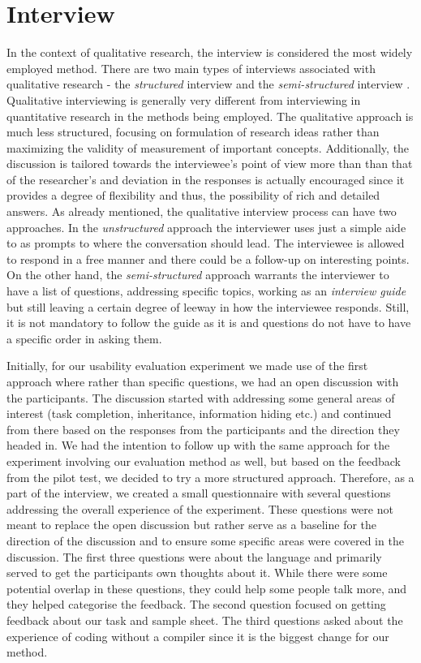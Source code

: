 \section{Interview}

In the context of qualitative research, the interview is considered the most widely employed method. There are two main types of interviews associated with qualitative research - the \textit{structured} interview and the \textit{semi-structured} interview . Qualitative interviewing is generally very different from  interviewing in quantitative research in the methods being employed. The qualitative approach is much less structured, focusing on formulation of research ideas rather than maximizing the validity of measurement of important concepts. Additionally, the discussion is tailored towards the interviewee's point of view more than than that of the researcher's and deviation in the responses is actually encouraged since it provides a degree of flexibility and thus, the possibility of rich and detailed answers. As already mentioned, the qualitative interview process can have two approaches. In the \textit{unstructured} approach the interviewer uses just a simple aide to as prompts to where the conversation should lead. The interviewee is allowed to respond in a free manner and there could be a follow-up on interesting points. On the other hand, the \textit{semi-structured} approach warrants the interviewer to have a list of questions, addressing specific topics, working as an \textit{interview guide} but still leaving a certain degree of leeway in how the interviewee responds. Still, it is not mandatory to follow the guide as it is and questions do not have to have a specific order in asking them. 

Initially, for our usability evaluation experiment we made use of the first approach where rather than specific questions, we had an open discussion with the participants. The discussion started with addressing some general areas of interest (task completion, inheritance, information hiding etc.) and continued from there based on the responses from the participants and the direction they headed in. We had the intention to follow up with the same approach for the experiment involving our evaluation method as well, but based on the feedback from the pilot test, we decided to try a more structured approach. 
Therefore, as a part of the interview, we created a small questionnaire with several questions addressing the overall experience of the experiment.
These questions were not meant to replace the open discussion but rather serve as a baseline for the direction of the discussion and to ensure some specific areas were covered in the discussion.
The first three questions were about the language and primarily served to get the participants own thoughts about it.
While there were some potential overlap in these questions, they could help some people talk more, and they helped categorise the feedback.
The second question focused on getting feedback about our task and sample sheet.
The third questions asked about the experience of coding without a compiler since it is the biggest change for our method.

